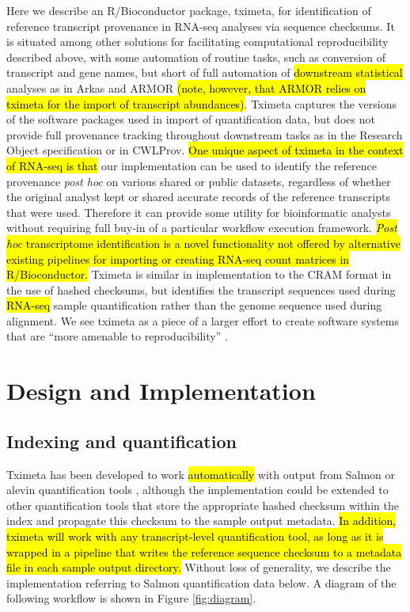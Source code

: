 Here we describe an R/Bioconductor package, tximeta, for
identification of reference transcript provenance in RNA-seq analyses
via sequence checksums. It is situated among other solutions for
facilitating computational reproducibility described above, with some
automation of routine tasks, such as conversion of transcript and gene
names, but short of full automation of \hl{downstream statistical} analyses
as in Arkas and ARMOR \hl{(note, however, that ARMOR relies on tximeta 
for the import of transcript abundances)}. Tximeta captures the versions of the software
packages used in import of quantification data, but does not provide
full provenance tracking throughout downstream tasks as in the
Research Object specification or in CWLProv. \hl{One unique aspect of
tximeta in the context of RNA-seq is that} our implementation can be
used to identify the reference provenance
\textit{post hoc} on various shared or public datasets, regardless of
whether the original analyst kept or shared accurate records of the
reference transcripts that were used. Therefore it can provide some
utility for bioinformatic analysts without requiring full buy-in of a
particular workflow execution framework.
\hl{\textit{Post hoc} transcriptome identification is a novel
functionality not offered by alternative existing pipelines for
importing or creating RNA-seq count matrices in R/Bioconductor.}
Tximeta is similar in implementation to the CRAM format in the use of
hashed checksums, but identifies the transcript sequences used during
\hl{RNA-seq} sample quantification rather than the genome sequence
used during alignment. We see tximeta as a piece of a larger effort to
create software systems that are ``more amenable to reproducibility''
\cite{Peng2011}.

\section*{Design and Implementation}

\subsection*{Indexing and quantification}

Tximeta has been developed to work \hl{automatically} with output from
Salmon or alevin quantification tools \cite{salmon,alevin},
although the implementation could be extended to other quantification
tools that store the appropriate hashed checksum within the index and
propagate this checksum to the sample output metadata.
\hl{In addition, tximeta will work with any transcript-level
quantification tool, as long as it is wrapped in a pipeline that
writes the reference sequence checksum to a metadata file in each
sample output directory.} Without loss of generality, we
describe the implementation referring to Salmon quantification data
below. A diagram of the following workflow is shown in Figure
\ref{fig:diagram}. 

